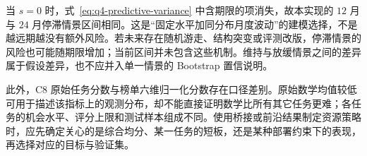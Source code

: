 当 $s=0$ 时，式~\eqref{eq:q4-predictive-variance} 中含期限的项消失，故本实现的 $12$ 月与 $24$ 月停滞情景区间相同。这是“固定水平加同分布月度波动”的建模选择，不是越远期越没有额外风险。若未来存在随机游走、结构突变或评测改版，停滞情景的风险也可能随期限增加；当前区间并未包含这些机制。维持与放缓情景之间的差异属于假设差异，也不应并入单一情景的 Bootstrap 置信说明。

此外，C8 原始任务分数与榜单六维归一化分数存在口径差别。原始数学均值较低可用于描述该指标上的观测分布，却不能直接证明数学比所有其它任务更难；各任务的机会水平、评分上限和测试样本组成不同。使用桥接或前沿结果制定资源策略时，应先确定关心的是综合均分、某一任务的短板，还是某种部署约束下的表现，再选择对应的目标与验证集。
